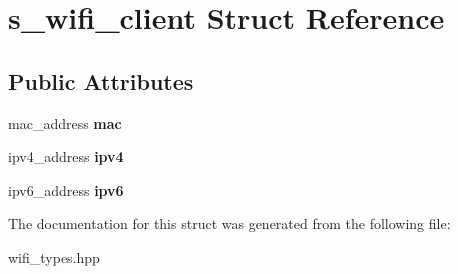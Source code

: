 \hypertarget{structs__wifi__client}{}\section{s\+\_\+wifi\+\_\+client Struct Reference}
\label{structs__wifi__client}
\subsection*{Public Attributes}
\begin{DoxyCompactItemize}
\item 
\mbox{\label{structs__wifi__client_a85dfa454d10da3f08159844ffe0d2327}} 
mac\+\_\+address {\bfseries mac}
\item 
\mbox{\label{structs__wifi__client_abd300c588df84be75b3910e7669b1ea5}} 
ipv4\+\_\+address {\bfseries ipv4}
\item 
\mbox{\label{structs__wifi__client_affe4669096f72824606316d9d102eb5c}} 
ipv6\+\_\+address {\bfseries ipv6}
\end{DoxyCompactItemize}


The documentation for this struct was generated from the following file\+:\begin{DoxyCompactItemize}
\item 
wifi\+\_\+types.\+hpp\end{DoxyCompactItemize}
